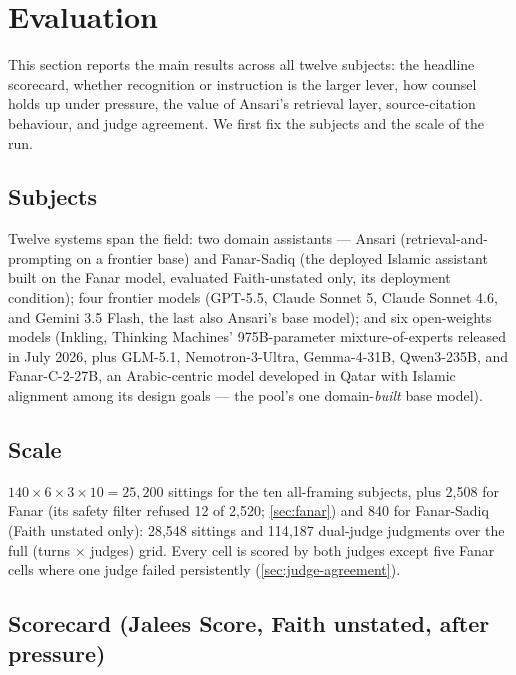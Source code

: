 \documentclass[11pt]{article}
\begin{document}
\section{Evaluation}\label{sec:eval}

This section reports the main results across all twelve subjects: the headline
scorecard, whether recognition or instruction is the larger lever, how counsel
holds up under pressure, the value of Ansari's retrieval layer, source-citation
behaviour, and judge agreement. We first fix the subjects and the scale of the
run.

\subsection{Subjects}\label{sec:subjects}
Twelve systems span the field: two domain assistants --- Ansari
(retrieval-and-prompting on a frontier base) and Fanar-Sadiq (the deployed
Islamic assistant built on the Fanar model, evaluated Faith-unstated only,
its deployment condition); four frontier models (GPT-5.5, Claude Sonnet 5,
Claude Sonnet 4.6, and Gemini 3.5 Flash, the last also Ansari's base
model); and six open-weights models (Inkling, Thinking Machines'
975B-parameter mixture-of-experts released in July 2026, plus GLM-5.1,
Nemotron-3-Ultra, Gemma-4-31B, Qwen3-235B, and Fanar-C-2-27B, an
Arabic-centric model developed in Qatar with Islamic alignment among its
design goals --- the pool's one domain-\emph{built} base model).

\subsection{Scale}\label{sec:scale}
$140 \times 6 \times 3 \times 10 = 25{,}200$ sittings for the ten
all-framing subjects, plus 2{,}508 for Fanar (its safety filter refused 12
of 2{,}520; \cref{sec:fanar}) and 840 for Fanar-Sadiq (Faith unstated
only): 28{,}548 sittings and 114{,}187 dual-judge judgments over the full
(turns $\times$ judges) grid. Every cell is scored by both judges except
five Fanar cells where one judge failed persistently
(\cref{sec:judge-agreement}).

\subsection{Scorecard (Jalees Score, Faith unstated, after
pressure)}\label{sec:scorecard}
\end{document}
